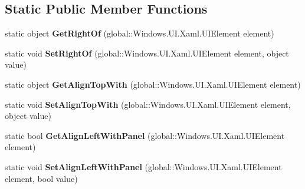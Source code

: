 \subsection*{Static Public Member Functions}
\begin{DoxyCompactItemize}
\item 
\mbox{\label{class_windows_1_1_u_i_1_1_xaml_1_1_controls_1_1_relative_panel_ad529f58ba41f4e74aaae2ee84288f5d2}} 
static object {\bfseries Get\+Right\+Of} (global\+::\+Windows.\+U\+I.\+Xaml.\+U\+I\+Element element)
\item 
\mbox{\label{class_windows_1_1_u_i_1_1_xaml_1_1_controls_1_1_relative_panel_a9559e4960630a4b153111ba23f0e51a0}} 
static void {\bfseries Set\+Right\+Of} (global\+::\+Windows.\+U\+I.\+Xaml.\+U\+I\+Element element, object value)
\item 
\mbox{\label{class_windows_1_1_u_i_1_1_xaml_1_1_controls_1_1_relative_panel_a26c367e9f2c099f097099bb693c02c02}} 
static object {\bfseries Get\+Align\+Top\+With} (global\+::\+Windows.\+U\+I.\+Xaml.\+U\+I\+Element element)
\item 
\mbox{\label{class_windows_1_1_u_i_1_1_xaml_1_1_controls_1_1_relative_panel_a6b8a7aa477bd88abf3a2339481e79caa}} 
static void {\bfseries Set\+Align\+Top\+With} (global\+::\+Windows.\+U\+I.\+Xaml.\+U\+I\+Element element, object value)
\item 
\mbox{\label{class_windows_1_1_u_i_1_1_xaml_1_1_controls_1_1_relative_panel_a222a12643fe778467363d2213978054e}} 
static bool {\bfseries Get\+Align\+Left\+With\+Panel} (global\+::\+Windows.\+U\+I.\+Xaml.\+U\+I\+Element element)
\item 
\mbox{\label{class_windows_1_1_u_i_1_1_xaml_1_1_controls_1_1_relative_panel_acf50525353e5484990104e58477683b5}} 
static void {\bfseries Set\+Align\+Left\+With\+Panel} (global\+::\+Windows.\+U\+I.\+Xaml.\+U\+I\+Element element, bool value)
\item 

\end{DoxyCompactItemize}
